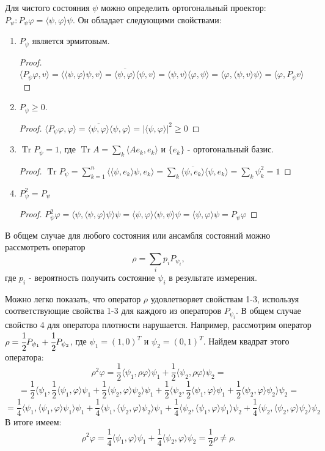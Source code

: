 \documentclass[%
master,         %
subf,           %
href,           %
colorlinks=true %
]{disser}
\DeclareMathOperator{\Tr}{Tr}
\numberwithin{equation}{section}
\numberwithin{figure}{section}
\begin{document}
Для чистого состояния $\psi$ можно определить ортогональный проектор: $P_\psi: P_\psi\varphi = \langle \psi, \varphi \rangle \psi$. Он обладает следующими свойствами:
\begin{enumerate}
\item $P_\psi$ является эрмитовым. 
\begin{proof}
$\langle P_\psi\varphi, v\rangle = \langle \langle\psi,\varphi\rangle \psi, v\rangle = \overline{\langle\psi,\varphi\rangle} \langle\psi, v\rangle = \langle\psi, v\rangle \langle\varphi,\psi\rangle  = \langle\varphi, \langle\psi, v\rangle\psi\rangle = \langle\varphi, P_\psi v \rangle$
\end{proof}
\item $P_\psi \geq 0$.
\begin{proof}
$\langle P_\psi\varphi, \varphi\rangle = \overline{\langle\psi,\varphi\rangle} \langle\psi, \varphi\rangle = |\langle\psi, \varphi\rangle|^2 \geq 0$
\end{proof}
\item $\Tr P_\psi = 1$, где $\Tr A = \sum_k \langle Ae_k, e_k\rangle$ и $\{e_k\}$  - ортогональный базис.
\begin{proof}
$\Tr P_\psi = \sum_{k = 1}^n \langle \langle \psi, e_k\rangle\psi, e_k\rangle = \sum_k \overline{\langle\psi, e_k\rangle}\langle\psi, e_k\rangle = \sum_k\psi_k^2 = 1$
\end{proof}
\item $P_\psi^2 = P_\psi$
\begin{proof}
$P_\psi^2\varphi = \langle\psi, \langle\psi, \varphi\rangle \psi\rangle \psi = \langle\psi, \varphi\rangle \langle\psi, \psi\rangle\psi = \langle\psi, \varphi\rangle\psi = P_\psi\varphi $
\end{proof}
\end{enumerate}
В общем случае для любого состояния или ансамбля состояний можно рассмотреть оператор
\[
\rho = \sum_ip_iP_{\psi_i},
\]
где $p_i$  - вероятность получить состояние $\psi_i$ в результате измерения.

Можно легко показать, что оператор $\rho$ удовлетворяет свойствам 1-3, используя соответствующие свойства 1-3 для каждого из операторов $P_{\psi_i}$. В общем случае свойство 4 для оператора плотности нарушается. Например, рассмотрим оператор $\rho = \cfrac 12P_{\psi_1} + \cfrac 12P_{\psi_2}$, где $\psi_1 = (1, 0)^T$ и $\psi_2 = (0, 1)^T$. Найдем квадрат этого оператора:
\[
\rho^2\varphi = \frac 12\langle\psi_1, \rho\varphi\rangle\psi_1 + \frac 12\langle\psi_2, \rho\varphi\rangle\psi_2 =
\]
\[
= \frac 12\langle\psi_1, \frac 12\langle\psi_1, \varphi\rangle\psi_1 + \frac 12\langle\psi_2, \varphi\rangle\psi_2 \rangle\psi_1 + \frac 12\langle\psi_2, \frac 12\langle\psi_1, \varphi\rangle\psi_1 + \frac 12\langle\psi_2, \varphi\rangle\psi_2 \rangle\psi_2 =
\]
\[
 = 
\frac 14\langle\psi_1, \langle\psi_1,\varphi\rangle\psi_1\rangle\psi_1 + \frac 14\langle\psi_1, \langle\psi_2,\varphi\rangle\psi_2\rangle\psi_1 +
\frac 14\langle\psi_2, \langle\psi_1,\varphi\rangle\psi_1\rangle\psi_2 + \frac 14\langle\psi_2, \langle\psi_2,\varphi\rangle\psi_2\rangle\psi_2
\]
В итоге имеем:
\[
\rho^2\varphi = \frac 14 \langle\psi_1, \varphi\rangle\psi_1 + \frac 14\langle\psi_2, \varphi\rangle\psi_2 = \frac 12\rho \neq \rho.
\]
\end{document}
